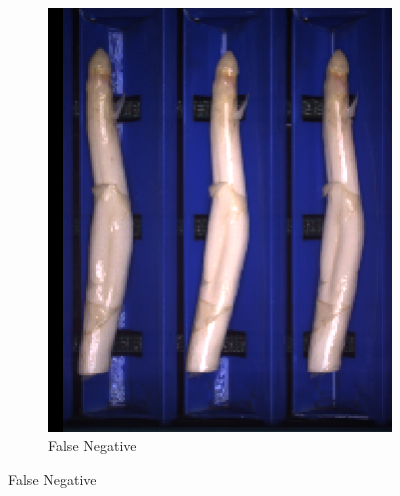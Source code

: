 \begin{figure}[h]
	\centering
	\begin{subfigure}{0.3\textwidth}
		\includegraphics[width=0.9\linewidth]{Figures/appendix/verythick_falsenegative_01.png}
		\vspace{-5pt}
		\caption{False Negative}
	\end{subfigure}


\end{figure}
